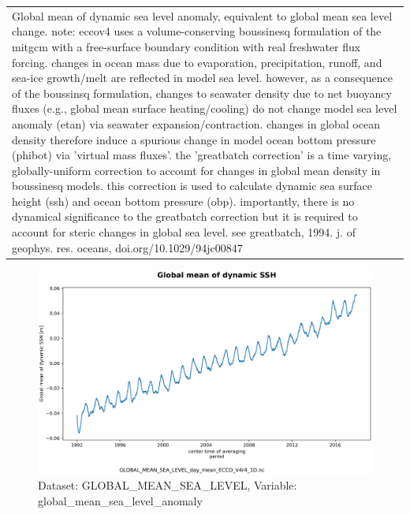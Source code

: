 \begin{longtable}{|m{}|m{}|m{}|m{}|}
\rowcolor{lightgray} \multicolumn{4}{|c|}{\textbf{Comments}} \\ \hline
\multicolumn{4}{|p{1\textwidth}|}{\footnotesize{{Global mean of dynamic sea level anomaly, equivalent to global mean sea level change. note: eccov4 uses a volume-conserving boussinesq formulation of the mitgcm with a free-surface boundary condition with real freshwater flux forcing. changes in ocean mass due to evaporation, precipitation, runoff, and sea-ice growth/melt are reflected in model sea level. however, as a consequence of the boussinsq formulation, changes to seawater density due to net buoyancy fluxes (e.g., global mean surface heating/cooling) do not change model sea level anomaly (etan) via seawater expansion/contraction. changes in global ocean density therefore induce a spurious change in model ocean bottom pressure (phibot) via 'virtual mass fluxes'. the 'greatbatch correction' is a time varying, globally-uniform correction to account for changes in global mean density in boussinesq models. this correction is used to calculate dynamic sea surface height (ssh) and ocean bottom pressure (obp). importantly, there is no dynamical significance to the greatbatch correction but it is required to account for steric changes in global sea level. see greatbatch, 1994. j. of geophys. res. oceans, doi.org/10.1029/94jc00847}}} \\ \hline
\end{longtable}

\begin{figure}[H]
\centering
\includegraphics[scale=0.55]{../images/plots/v4r4/oneD_plots/Global_Mean_Sea_Level/global_mean_sea_level_anomaly.png}
\caption{Dataset: GLOBAL\_MEAN\_SEA\_LEVEL, Variable: global\_mean\_sea\_level\_anomaly}
\label{tab:table-GLOBAL_MEAN_SEA_LEVEL_global_mean_sea_level_anomaly-Plot}
\end{figure}
\newpage
\pagebreak
